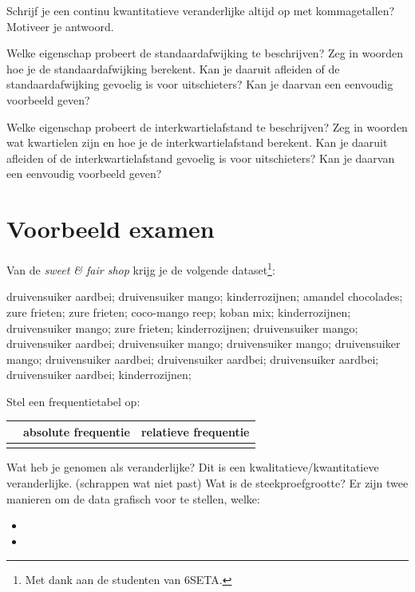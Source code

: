 \documentclass[12pt,twoside]{article}
\begin{document}
\begin{oefening}
Schrijf je een continu kwantitatieve veranderlijke altijd op met kommagetallen? Motiveer je
antwoord.
\end{oefening}

\begin{oefening}
Welke eigenschap probeert de standaardafwijking te beschrijven? Zeg in woorden hoe je de
standaardafwijking berekent. Kan je daaruit afleiden of de standaardafwijking gevoelig is
voor uitschieters? Kan je daarvan een eenvoudig voorbeeld geven?
\end{oefening}

\begin{oefening}
Welke eigenschap probeert de interkwartielafstand te beschrijven? Zeg in woorden wat
kwartielen zijn en hoe je de interkwartielafstand berekent. Kan je daaruit afleiden of de
interkwartielafstand gevoelig is voor uitschieters? Kan je daarvan een eenvoudig voorbeeld
geven?
\end{oefening}

\newpage
\section*{Voorbeeld examen}
Van de {\em sweet \& fair shop} krijg je de volgende dataset\footnote{Met dank aan de studenten van 6SETA.}:

druivensuiker aardbei; druivensuiker mango; kinderrozijnen; amandel chocolades; zure frieten; zure frieten; coco-mango reep; koban mix; kinderrozijnen; druivensuiker mango; zure frieten; kinderrozijnen;  druivensuiker mango; druivensuiker aardbei;  druivensuiker mango; druivensuiker mango; druivensuiker mango; druivensuiker aardbei; druivensuiker aardbei; druivensuiker aardbei; druivensuiker aardbei; kinderrozijnen;

Stel een frequentietabel op:
\begin{center}
  \begin{tabular}{p{4cm}|p{4cm}|p{4cm}}
    &absolute frequentie&relatieve frequentie\\
    \hline
    &&\\[6cm]
  \end{tabular}
\end{center}

Wat heb je genomen als veranderlijke? \arulefill
Dit is een kwalitatieve/kwantitatieve veranderlijke. {\tiny (schrappen wat niet past)}
Wat is de steekproefgrootte? \arulefill
Er zijn twee manieren om de data grafisch voor te stellen, welke:
\begin{itemize}
  \item \arule{6cm}
  \item \arule{6cm}
\end{itemize}
\end{document}
